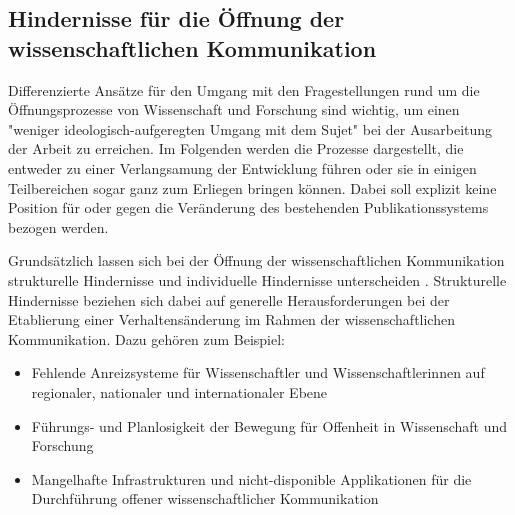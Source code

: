 \subsection{Hindernisse für die Öffnung der wissenschaftlichen Kommunikation}

Differenzierte Ansätze für den Umgang mit den Fragestellungen rund um die Öffnungsprozesse von Wissenschaft und Forschung sind wichtig, um einen "weniger ideologisch-aufgeregten Umgang mit dem Sujet" \cite[:13]{Naeder_2010} bei der Ausarbeitung der Arbeit zu erreichen. Im Folgenden werden die Prozesse dargestellt, die entweder zu einer Verlangsamung der Entwicklung führen oder sie in einigen Teilbereichen sogar ganz zum Erliegen bringen können. Dabei soll explizit keine Position für oder gegen die Veränderung des bestehenden Publikationssystems bezogen werden.

Grundsätzlich lassen sich bei der Öffnung der wissenschaftlichen Kommunikation strukturelle Hindernisse und individuelle Hindernisse unterscheiden \cite{Scheliga_2014}. Strukturelle Hindernisse beziehen sich dabei auf generelle Herausforderungen bei der Etablierung einer Verhaltensänderung im Rahmen der wissenschaftlichen Kommunikation. Dazu gehören zum Beispiel:
\begin{itemize}
\item Fehlende Anreizsysteme für Wissenschaftler und Wissenschaftlerinnen auf regionaler, nationaler und internationaler Ebene
\item Führungs- und Planlosigkeit der Bewegung für Offenheit in Wissenschaft und Forschung
\item Mangelhafte Infrastrukturen und nicht-disponible Applikationen für die Durchführung offener wissenschaftlicher Kommunikation
\end{itemize}

